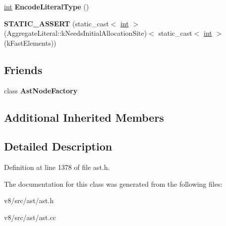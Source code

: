\begin{DoxyCompactItemize}
\item 
\mbox{\label{classv8_1_1internal_1_1ObjectLiteral_afe48adbabb5e26f5bec8a7c71f0052eb}} 
\mbox{\hyperlink{classint}{int}} {\bfseries Encode\+Literal\+Type} ()
\item 
\mbox{\label{classv8_1_1internal_1_1ObjectLiteral_a6a75aeb66845fd00ddab778b887d1422}} 
{\bfseries S\+T\+A\+T\+I\+C\+\_\+\+A\+S\+S\+E\+RT} (static\+\_\+cast$<$ \mbox{\hyperlink{classint}{int}} $>$(Aggregate\+Literal\+::k\+Needs\+Initial\+Allocation\+Site)$<$ static\+\_\+cast$<$ \mbox{\hyperlink{classint}{int}} $>$(k\+Fast\+Elements))
\end{DoxyCompactItemize}
\subsection*{Friends}
\begin{DoxyCompactItemize}
\item 
\mbox{\label{classv8_1_1internal_1_1ObjectLiteral_a8d587c8ad3515ff6433eb83c578e795f}} 
class {\bfseries Ast\+Node\+Factory}
\end{DoxyCompactItemize}
\subsection*{Additional Inherited Members}


\subsection{Detailed Description}


Definition at line 1378 of file ast.\+h.



The documentation for this class was generated from the following files\+:\begin{DoxyCompactItemize}
\item 
v8/src/ast/ast.\+h\item 
v8/src/ast/ast.\+cc\end{DoxyCompactItemize}

